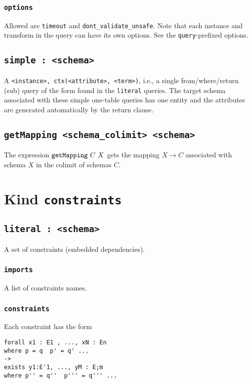 \documentclass[10pt]{book}
\begin{document}
\subsection{{\tt options}}
Allowed are {\tt timeout} and {\tt dont\_validate\_unsafe}.  Note that each instance and transform in the query can have its own options.  See the {\tt query}-prefixed options.

\section{{\tt simple : <schema>}} 

A {\tt <instance>, ctx(<attribute>, <term>)}, i.e., a single from/where/return (sub) query of the form found in the {\tt literal} queries.  The target schema associated with these simple one-table queries has one entity and the attributes are generated automatically by the return clause. 

\section{{\tt getMapping <schema\_colimit> <schema>}}

The expression ${\tt getMapping} \ C \ X$ gets the mapping $X \to C$ associated with schema $X$ in the colimit of schemas $C$.

\chapter{Kind {\tt constraints}}

\section{{\tt literal : <schema>}}

A set of constraints (embedded dependencies). 

\subsection{{\tt imports}}
A list of constraints names.

\subsection{{\tt constraints}}
 Each constraint has the form
\begin{verbatim}
forall x1 : E1 , ..., xN : En 
where p = q  p' = q' ...
->
exists y1:E'1, ..., yM : E;m 
where p'' = q''  p''' = q''' ...
\end{verbatim}
\end{document}
